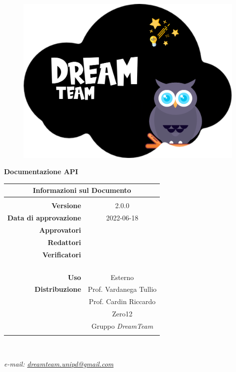 
\begin{center}

\begin{figure}
\centering
\includegraphics[scale=0.05]{Contenuto/Immagini/DreamTeam.png} 
\end{figure}

{\Huge{\textbf{Documentazione API}}} \\ [1cm]
\begin{table}[htbp]
\centering
\begin{tabular}{r|c}
\multicolumn{2}{c}{\textbf{Informazioni sul Documento}} \\
\hline \\
\textbf{Versione} & 2.0.0 \\ \rule{0pt}{3ex}    
\textbf{Data di approvazione} & 2022-06-18 \\ \rule{0pt}{3ex}   
\textbf{Approvatori} & \PV{} \\ \rule{0pt}{3ex}      
\textbf{Redattori} & \MG{} \\ \rule{0pt}{2ex}     
\textbf{Verificatori} & \FP{} \\ \rule{0pt}{2ex}   
&  \\ \rule{0pt}{2ex}   
&  \\ \rule{0pt}{2ex}
&  \\ \rule{0pt}{2ex} 
&  \\ \rule{0pt}{3ex}        
\textbf{Uso} & Esterno \\ \rule{0pt}{3ex}    
\textbf{Distribuzione} & Prof. Vardanega Tullio \\ \rule{0pt}{2ex}   
& Prof. Cardin Riccardo \\ \rule{0pt}{2ex}
& Zero12 \\ \rule{0pt}{2ex}      
& Gruppo \textit{DreamTeam} \\ \rule{0pt}{0.1cm}   
\end{tabular} \\ [0.5cm]
\end{table}

\textsl{ e-mail: \href{mailto:dreamteam.unipd@gmail.com}{dreamteam.unipd@gmail.com} } \\[2cm]
\end{center}
\pagebreak